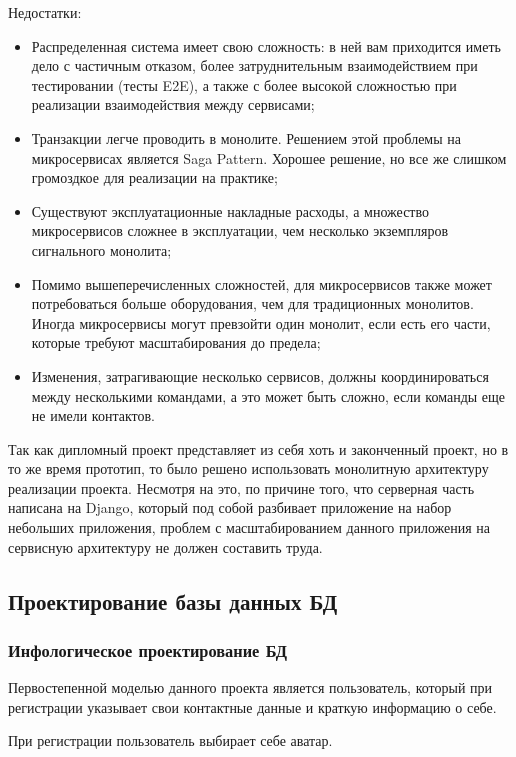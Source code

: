 Недостатки:
\begin{itemize}
    \item Распределенная система имеет свою сложность: в ней вам приходится иметь дело с частичным отказом, более затруднительным взаимодействием при тестировании (тесты E2E), а также с более высокой сложностью при реализации взаимодействия между сервисами;
    \item Транзакции легче проводить в монолите.
    Решением этой проблемы на микросервисах является Saga Pattern.
    Хорошее решение, но все же слишком громоздкое для реализации на практике;
    \item Существуют эксплуатационные накладные расходы, а множество микросервисов сложнее в эксплуатации, чем несколько экземпляров сигнального монолита;
    \item Помимо вышеперечисленных сложностей, для микросервисов также может потребоваться больше оборудования, чем для традиционных монолитов.
    Иногда микросервисы могут превзойти один монолит, если есть его части, которые требуют масштабирования до предела;
    \item Изменения, затрагивающие несколько сервисов, должны координироваться между несколькими командами, а это может быть сложно, если команды еще не имели контактов.


\end{itemize}
\bigbreak

Так как дипломный проект представляет из себя хоть и законченный проект, но в то же время прототип, то было решено использовать монолитную архитектуру реализации проекта.
Несмотря на это, по причине того, что серверная часть написана на Django, который под собой разбивает приложение на набор небольших приложения, проблем с масштабированием данного приложения на сервисную архитектуру не должен составить труда.


\subsection{Проектирование базы данных БД}

\subsubsection{Инфологическое проектирование БД}\hfill

Первостепенной моделью данного проекта является пользователь, который при регистрации указывает свои контактные данные и краткую информацию о себе.

При регистрации пользователь выбирает себе аватар.

